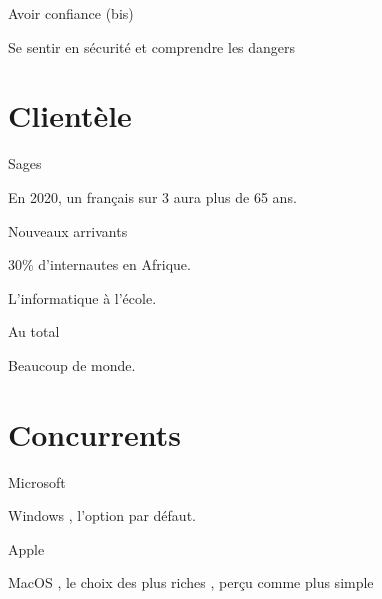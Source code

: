 \documentclass[xcolor=svgnames]{beamer}
\begin{document}
    \begin{frame}{Avoir confiance (bis)}
    
        Se sentir en sécurité \pause et comprendre les dangers
        
    \end{frame}
    

\section{Clientèle}

    \begin{frame}{Sages}
    
        En 2020, un français sur 3 aura plus de 65 ans.
        
    \end{frame}
    
    \begin{frame}{Nouveaux arrivants}
        
        30\% d’internautes en Afrique. \pause
        
        
        L’informatique à l’école.
        
    \end{frame}
    
    
    \begin{frame}{Au total}
        
        Beaucoup de monde.
        
    \end{frame}
    
    
\section{Concurrents}

    \begin{frame}{Microsoft}
        
        Windows \pause, l'option par défaut.
        
    \end{frame}
    
    \begin{frame}{Apple}
    
        MacOS \pause, le choix des plus riches \pause, perçu comme plus simple
        
    \end{frame}
    
\end{document}
